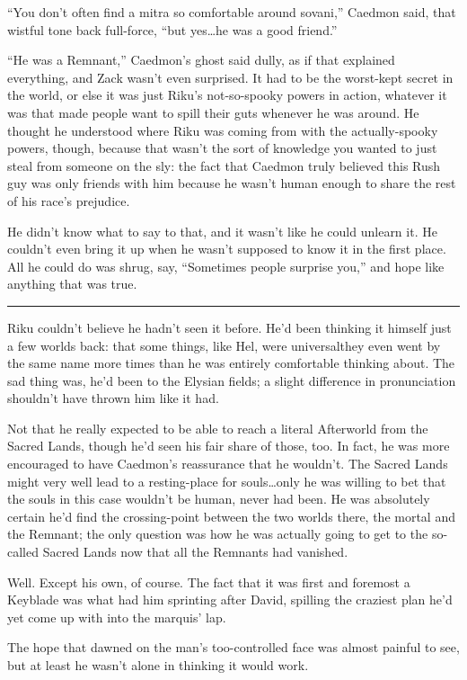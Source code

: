 ``You don't often find a mitra so comfortable around sovani,'' Caedmon said, that wistful tone back full-force, ``but yes\ldots he was a good friend.''

``He was a Remnant,'' Caedmon's ghost said dully, as if that explained everything, and Zack wasn't even surprised. It had to be the worst-kept secret in the world, or else it was just Riku's not-so-spooky powers in action, whatever it was that made people want to spill their guts whenever he was around. He thought he understood where Riku was coming from with the actually-spooky powers, though, because that wasn't the sort of knowledge you wanted to just steal from someone on the sly: the fact that Caedmon truly believed this Rush guy was only friends with him because he wasn't human enough to share the rest of his race's prejudice.

He didn't know what to say to that, and it wasn't like he could unlearn it. He couldn't even bring it up when he wasn't supposed to know it in the first place. All he could do was shrug, say, ``Sometimes people surprise you,'' and hope like anything that was true.

\fancybreak{\pfbreakdisplay}


Riku couldn't believe he hadn't seen it before. He'd been thinking it himself just a few worlds back: that some things, like Hel, were universal\textemdash they even went by the same name more times than he was entirely comfortable thinking about. The sad thing was, he'd been to the Elysian fields; a slight difference in pronunciation shouldn't have thrown him like it had.

Not that he really expected to be able to reach a literal Afterworld from the Sacred Lands, though he'd seen his fair share of those, too. In fact, he was more encouraged to have Caedmon's reassurance that he wouldn't. The Sacred Lands might very well lead to a resting-place for souls\ldots only he was willing to bet that the souls in this case wouldn't be human, never had been. He was absolutely certain he'd find the crossing-point between the two worlds there, the mortal and the Remnant; the only question was how he was actually going to get to the so-called Sacred Lands now that all the Remnants had vanished.

Well. Except his own, of course. The fact that it was first and foremost a Keyblade was what had him sprinting after David, spilling the craziest plan he'd yet come up with into the marquis' lap.

The hope that dawned on the man's too-controlled face was almost painful to see, but at least he wasn't alone in thinking it would work.

